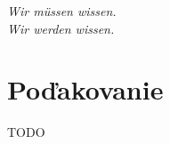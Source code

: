 \thispagestyle{empty}
\vspace*{\fill}

\begin{center}
\settowidth{}
\parbox{\longest}{
  \hrulefill\hspace{0.2cm} \decofourleft\decofourright \hspace{0.2cm} \hrulefill\par
  \raggedright{
  \itshape
  	Wir müssen wissen. \\ Wir werden wissen.\par
  }   
  \par
  \hrulefill\hspace{0.2cm} \decofourleft\decofourright\hspace{0.2cm} \hrulefill\par
}
\end{center}


\vspace*{\fill}
\section*{Poďakovanie}
{\small TODO }
%
%
%


\vspace{3cm}